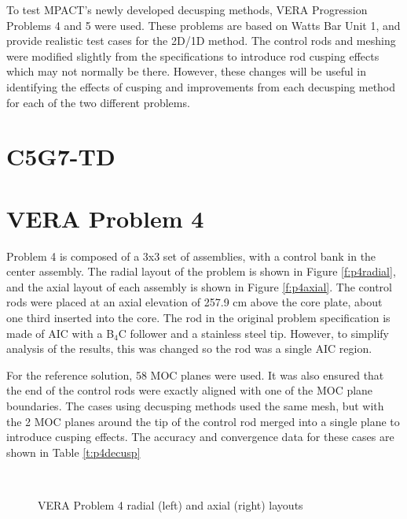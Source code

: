 To test MPACT's newly developed decusping methods, VERA Progression Problems 4 and 5 \cite{VERAProgressionProblems} were used.  These problems are based on Watts Bar Unit 1, and provide realistic test cases for the 2D/1D method.  The control rods and meshing were modified slightly from the specifications to introduce rod cusping effects which may not normally be there.  However, these changes will be useful in identifying the effects of cusping and improvements from each decusping method for each of the two different problems.

\section{C5G7-TD}

\section{VERA Problem 4}

Problem 4 is composed of a 3x3 set of assemblies, with a control bank in the center assembly.  The radial layout of the problem is shown in Figure \ref{f:p4radial}, and the axial layout of each assembly is shown in Figure \ref{f:p4axial}.  The control rods were placed at an axial elevation of 257.9 cm above the core plate, about one third inserted into the core.  The rod in the original problem specification is made of AIC with a B$_4$C follower and a stainless steel tip.  However, to simplify analysis of the results, this was changed so the rod was a single AIC region.

For the reference solution, 58 MOC planes were used.  It was also ensured that the end of the control rods were exactly aligned with one of the MOC plane boundaries.  The cases using decusping methods used the same mesh, but with the 2 MOC planes around the tip of the control rod merged into a single plane to introduce cusping effects.  The accuracy and convergence data for these cases are shown in Table \ref{t:p4decusp}

\begin{figure}[h]\label{f:p4layout}
\centering
{}
~
\caption{VERA Problem 4 radial (left) and axial (right) layouts}\label{f:p4}
\end{figure}

